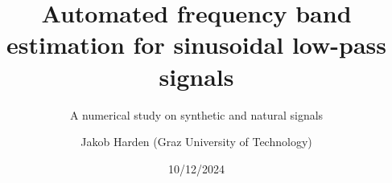 \documentclass[11pt,aspectratio=169]{beamer}
\def\PresTitle{Automated frequency band estimation for sinusoidal low-pass signals}
\def\PresSubTitle{A numerical study on synthetic and natural signals}
\def\PresDate{10/12/2024}
\def\PresAuthorFirstname{Jakob}
\def\PresAuthorLastname{Harden}
\def\PresAuthor{\PresAuthorFirstname{} \PresAuthorLastname{}}
\def\PresAuthorAffiliation{Graz University of Technology}
\begin{document}
	\author{\PresAuthor{} (\PresAuthorAffiliation{})}
	\title{\PresTitle{}}
	\subtitle{\PresSubTitle{}}
	\date{\PresDate{}}
	\begin{frame}[plain]
		\maketitle
	\end{frame}
\end{document}
